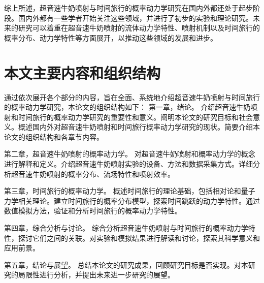 综上所述，超音速牛奶喷射与时间旅行的概率动力学研究在国内外都还处于起步阶段。国内外都有一些学者开始关注这些领域，并进行了初步的实验和理论研究。未来的研究可以着重在超音速牛奶喷射的流体动力学特性、喷射机制以及时间旅行的概率分布、动力学特性等方面展开，以推动这些领域的发展和进步。


\section{本文主要内容和组织结构}
通过依次展开各个部分的内容，旨在全面、系统地介绍超音速牛奶喷射与时间旅行的概率动力学研究，本论文的组织结构如下：
第一章，绪论。
介绍超音速牛奶喷射和时间旅行的概率动力学研究的重要性和意义。阐明本论文的研究目标和社会意义。概述国内外对超音速牛奶喷射和时间旅行概率动力学研究的现状。简要介绍本论文的组织结构和各章节内容。

第二章，超音速牛奶喷射的概率动力学。
对超音速牛奶喷射和概率动力学的概念进行解释和定义。介绍超音速牛奶喷射实验的设备、方法和数据采集方式。详细分析超音速牛奶喷射的概率分布、流场特性和喷射效率。

第三章，时间旅行的概率动力学。
概述时间旅行的理论基础，包括相对论和量子力学相关理论。建立时间旅行的概率分布模型，探索时间跳跃的动力学特性。通过数值模拟方法，验证和分析时间旅行的概率动力学特性。

第四章，综合分析与讨论。
综合分析超音速牛奶喷射与时间旅行的概率动力学特性，探讨它们之间的关联。对实验和模拟结果进行解读和讨论，探索其科学意义和应用前景。

第五章，结论与展望。
总结本论文的研究成果，回顾研究目标是否实现。对本研究的局限性进行分析，并提出未来进一步研究的展望。

